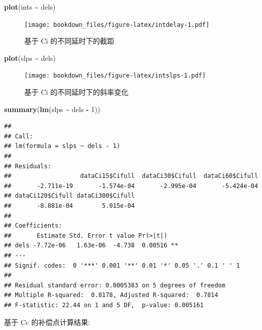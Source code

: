 \documentclass[
]{krantz}
\makeatletter
\newenvironment{Shaded}{\begin{snugshade}}{\end{snugshade}}
\newcommand{\DecValTok}[1]{\textcolor[rgb]{0.00,0.00,0.81}{#1}}
\newcommand{\KeywordTok}[1]{\textcolor[rgb]{0.13,0.29,0.53}{\textbf{#1}}}
\newcommand{\NormalTok}[1]{#1}
\newcommand{\OperatorTok}[1]{\textcolor[rgb]{0.81,0.36,0.00}{\textbf{#1}}}
\newcommand{\StringTok}[1]{\textcolor[rgb]{0.31,0.60,0.02}{#1}}
\newenvironment{kframe}{%
\medskip{}
\setlength{\fboxsep}{.8em}
 \def\at@end@of@kframe{}%
 \ifinner\ifhmode%
  \def\at@end@of@kframe{\end{minipage}}%
  \begin{minipage}{\columnwidth}%
 \fi\fi%
 \def\FrameCommand##1{\hskip\@totalleftmargin \hskip-\fboxsep
 \colorbox{shadecolor}{##1}\hskip-\fboxsep
     \hskip-\linewidth \hskip-\@totalleftmargin \hskip\columnwidth}%
 \MakeFramed {\advance\hsize-\width
   \@totalleftmargin\z@ \linewidth\hsize
   \@setminipage}}%
 {\par\unskip\endMakeFramed%
 \at@end@of@kframe}
\renewenvironment{Shaded}{\begin{kframe}}{\end{kframe}}
\makeatother
\begin{document}
\begin{Shaded}
\begin{Highlighting}[]
\KeywordTok{plot}\NormalTok{(ints }\OperatorTok{\textasciitilde{}}\StringTok{ }\NormalTok{dels)}
\end{Highlighting}
\end{Shaded}

\begin{figure}
\centering
\texttt{[image: bookdown\_files/figure-latex/intdelay-1.pdf]}
\caption{\label{fig:intdelay}基于 Ci 的不同延时下的截距}
\end{figure}

\begin{Shaded}
\begin{Highlighting}[]
\KeywordTok{plot}\NormalTok{(slps }\OperatorTok{\textasciitilde{}}\StringTok{ }\NormalTok{dels)}
\end{Highlighting}
\end{Shaded}

\begin{figure}
\centering
\texttt{[image: bookdown\_files/figure-latex/intslps-1.pdf]}
\caption{\label{fig:intslps}基于 Ci 的不同延时下的斜率变化}
\end{figure}

\begin{Shaded}
\begin{Highlighting}[]
\KeywordTok{summary}\NormalTok{(}\KeywordTok{lm}\NormalTok{(slps }\OperatorTok{\textasciitilde{}}\StringTok{ }\NormalTok{dels }\OperatorTok{{-}}\StringTok{ }\DecValTok{1}\NormalTok{))}
\end{Highlighting}
\end{Shaded}

\begin{verbatim}
## 
## Call:
## lm(formula = slps ~ dels - 1)
## 
## Residuals:
##                   dataCi15$Cifull  dataCi30$Cifull  dataCi60$Cifull 
##       -2.711e-19       -1.574e-04       -2.995e-04       -5.424e-04 
## dataCi120$Cifull dataCi300$Cifull 
##       -8.881e-04        5.015e-04 
## 
## Coefficients:
##       Estimate Std. Error t value Pr(>|t|)   
## dels -7.72e-06   1.63e-06  -4.738  0.00516 **
## ---
## Signif. codes:  0 '***' 0.001 '**' 0.01 '*' 0.05 '.' 0.1 ' ' 1
## 
## Residual standard error: 0.0005383 on 5 degrees of freedom
## Multiple R-squared:  0.8178,	Adjusted R-squared:  0.7814 
## F-statistic: 22.44 on 1 and 5 DF,  p-value: 0.005161
\end{verbatim}

基于 Cc 的补偿点计算结果:
\end{document}

